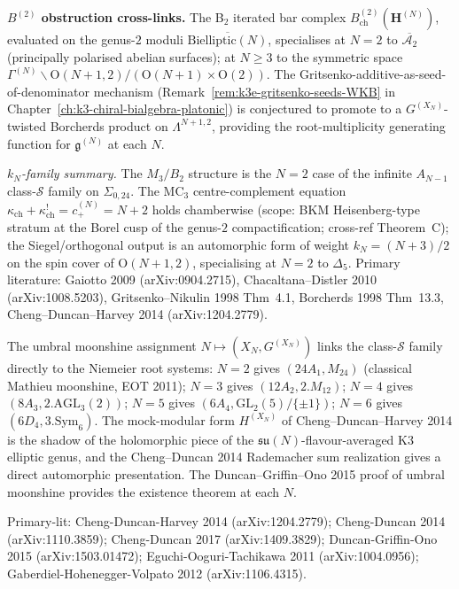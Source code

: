\begin{remark}
\textbf{$B^{(2)}$ obstruction cross-links.} The B$_2$ iterated bar complex
$B^{(2)}_{\mathrm{ch}}(\mathbf{H}^{(N)})$, evaluated on the genus-$2$
moduli $\overline{\mathrm{Bielliptic}(N)}$, specialises at
$N=2$ to $\overline{\mathcal{A}_2}$ (principally polarised abelian
surfaces); at $N\geq 3$ to the symmetric space
$\Gamma^{(N)} \backslash \mathrm{O}(N{+}1,2)/(\mathrm{O}(N{+}1)\times\mathrm{O}(2))$.
The Gritsenko-additive-as-seed-of-denominator mechanism
(Remark~\ref{rem:k3e-gritsenko-seeds-WKB} in
Chapter~\ref{ch:k3-chiral-bialgebra-platonic}) is conjectured to
promote to a $G^{(X_N)}$-twisted Borcherds product on $\Lambda^{N+1,2}$,
providing the root-multiplicity generating function for
$\mathfrak{g}^{(N)}$ at each $N$.

\emph{$k_N$-family summary.} The $M_3/B_2$ structure is the $N = 2$ case of
the infinite $A_{N-1}$ class-$\mathcal S$ family on $\Sigma_{0,24}$. The
MC$_3$ centre-complement equation
$\kappa_{\mathrm{ch}} + \kappa_{\mathrm{ch}}^! = c_+^{(N)} = N{+}2$
holds chamberwise (scope: BKM Heisenberg-type stratum at the Borel cusp
of the genus-$2$ compactification; cross-ref Theorem~C); the
Siegel/orthogonal output is an automorphic form of weight
$k_N = (N+3)/2$ on the spin cover of $\mathrm{O}(N{+}1,2)$, specialising
at $N = 2$ to $\Delta_5$. Primary literature: Gaiotto 2009
(arXiv:0904.2715), Chacaltana--Distler 2010 (arXiv:1008.5203),
Gritsenko--Nikulin 1998 Thm~4.1, Borcherds 1998 Thm~13.3,
Cheng--Duncan--Harvey 2014 (arXiv:1204.2779).
\end{remark}

\begin{remark}
\label{rem:m3b2-umbral-extension}
The umbral moonshine assignment $N \mapsto (X_N, G^{(X_N)})$ links the
class-$\mathcal S$ family directly to the Niemeier root systems:
$N=2$ gives $(24A_1, M_{24})$ (classical Mathieu moonshine, EOT 2011);
$N=3$ gives $(12A_2, 2.M_{12})$; $N=4$ gives $(8A_3, 2.\mathrm{AGL}_3(2))$;
$N=5$ gives $(6A_4, \mathrm{GL}_2(5)/\{\pm 1\})$; $N=6$ gives
$(6D_4, 3.\mathrm{Sym}_6)$. The mock-modular form $H^{(X_N)}$
of Cheng--Duncan--Harvey 2014 is the shadow of the holomorphic
piece of the $\mathfrak{su}(N)$-flavour-averaged K3 elliptic genus,
and the Cheng--Duncan 2014 Rademacher sum realization gives a
direct automorphic presentation. The Duncan--Griffin--Ono 2015
proof of umbral moonshine provides the existence theorem at each $N$.

Primary-lit: Cheng-Duncan-Harvey 2014 (arXiv:1204.2779);
Cheng-Duncan 2014 (arXiv:1110.3859);
Cheng-Duncan 2017 (arXiv:1409.3829);
Duncan-Griffin-Ono 2015 (arXiv:1503.01472);
Eguchi-Ooguri-Tachikawa 2011 (arXiv:1004.0956);
Gaberdiel-Hohenegger-Volpato 2012 (arXiv:1106.4315).
\end{remark}



